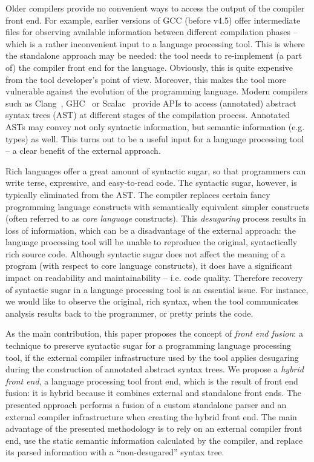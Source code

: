 \documentclass[11pt]{amsart}
\begin{document}
Older compilers provide no convenient ways to access the output of
the compiler front end. For example, earlier versions of GCC (before v4.5)
offer intermediate files for observing available information between different compilation
phases -- which is a rather inconvenient input to a language processing tool.
This is where the standalone approach may be needed: the tool needs to
re-implement (a part of) the compiler front end for the language. Obviously,
this is
quite expensive from the tool developer's point of view. Moreover,
this makes the tool more vulnerable against the evolution of the programming
language. 
Modern compilers such as Clang~\cite[p.~32]{llvm}, GHC~\cite{ghc-plugin} or
Scalac~\cite{programming-scala} provide
APIs
to access (annotated) abstract syntax trees (AST) at different stages of
the compilation process. 
Annotated ASTs may convey not only syntactic information, but
semantic information (e.g. types) as well.
This turns out to be a useful input for a language processing tool
-- a clear benefit of the external approach.

Rich languages offer a great amount of syntactic sugar,
so that programmers can write terse, expressive, and easy-to-read code.
The syntactic sugar, however, is typically eliminated from the AST.
The compiler replaces certain fancy programming language constructs with
semantically equivalent simpler constructs (often referred to as \emph{core language}
constructs). This \emph{desugaring} process results in loss of information,
which can be a disadvantage of the external approach: the language processing
tool will be unable to reproduce the original, syntactically rich
source code.
Although syntactic sugar does not affect the meaning of a program (with respect
to core language constructs), it does have a significant impact on readability and
maintainability -- i.e. code quality. Therefore recovery of syntactic sugar in
a language processing tool is an essential issue.
For instance, we would like to observe the original, rich syntax, when the
tool communicates analysis results back to the programmer,
or pretty prints the code. 

As the main contribution, this paper proposes the concept of
\emph{front end fusion}: a technique to preserve syntactic sugar for a
programming language processing tool, if the external compiler
infrastructure used by the tool applies desugaring during the
construction of annotated abstract syntax trees. We propose a
\emph{hybrid front end}, a language processing tool front end, which
is the result of front end fusion: it is hybrid because it combines
external and standalone front ends. The presented approach performs
a fusion of a custom standalone parser and an external compiler
infrastructure when creating the hybrid front end. The main advantage
of the presented methodology is to rely on an external compiler front
end, use the static semantic information calculated by the compiler,
and replace its parsed information with a ``non-desugared'' syntax tree.
\end{document}
